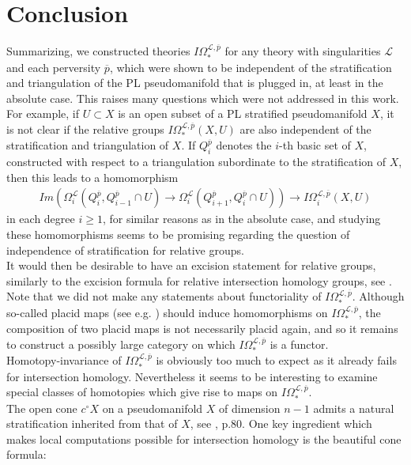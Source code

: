 \documentclass{scrreprt}
\begin{document}
\chapter{Conclusion}
Summarizing, we constructed theories $I\Omega_*^{\mathcal{L},\overline{p}}$ for any theory with singularities $\mathcal{L}$ and each perversity $\overline{p}$, which were shown to be independent of the stratification and triangulation of the PL pseudomanifold that is plugged in, at least in the absolute case. This raises many questions which were not addressed in this work. For example, if $U \subset X$ is an open subset of a PL stratified pseudomanifold $X$, it is not clear if the relative groups $I\Omega_*^{\mathcal{L},\overline{p}}(X,U)$ are also independent of the stratification and triangulation of $X$. If $Q_i^{\overline{p}}$ denotes the $i$-th basic set of $X$, constructed with respect to a triangulation subordinate to the stratification of $X$, then this leads to a homomorphism
\begin{align*}
Im(\Omega_i^{\mathcal{L}}(Q_i^{\overline{p}},Q_{i-1}^{\overline{p}}\cap U) \to \Omega_i^{\mathcal{L}}(Q_{i+1}^{\overline{p}},Q_{i}^{\overline{p}}\cap U)) \to I\Omega_i^{\mathcal{L},\overline{p}}(X,U)
\end{align*}
in each degree $i \geq 1$, for similar reasons as in the absolute case, and studying these homomorphisms seems to be promising regarding the question of independence of stratification for relative groups. \\
It would then be desirable to have an excision statement for relative groups, similarly to the excision formula for relative intersection homology groups, see \cite{GMMorse}. \\
Note that we did not make any statements about functoriality of $I\Omega_*^{\mathcal{L},\overline{p}}$. Although so-called placid maps (see e.g. \cite{borel}) should induce homomorphisms on $I\Omega_*^{\mathcal{L},\overline{p}}$, the composition of two placid maps is not necessarily placid again, and so it remains to construct a possibly large category on which $I\Omega_*^{\mathcal{L},\overline{p}}$ is a functor. \\
Homotopy-invariance of $I\Omega_*^{\mathcal{L},\overline{p}}$ is obviously too much to expect as it already fails for intersection homology. Nevertheless it seems to be interesting to examine special classes of homotopies which give rise to maps on $I\Omega_*^{\mathcal{L},\overline{p}}$. \\
The open cone $c^{\circ}X$ on a pseudomanifold $X$ of dimension $n-1$ admits a natural stratification inherited from that of $X$, see \cite{banagl}, p.80. One key ingredient which makes local computations possible for intersection homology is the beautiful cone formula:
\end{document}

